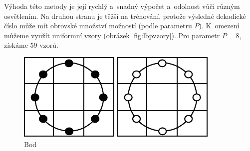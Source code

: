 Výhoda této metody je její rychlý a~snadný výpočet a~odolnost vůči různým osvětlením. Na druhou stranu je těžší na trénování, protože výsledné dekadické číslo může mít obrovské množství možností (podle parametru $P$). K~omezení můžeme využít uniformní vzory (obrázek \ref{fig:lbpvzory}). Pro parametr $P=8$, získáme 59 vzorů. 

\begin{figure}[H]
\centering
\begin{minipage}[b]{.18\textwidth}
  \centering
  \includegraphics[width=.9\linewidth]{figures/lbp_spot}
  \caption*{Bod}
\end{minipage}
\begin{minipage}[b]{.18\textwidth}
  \centering
  \includegraphics[width=.9\linewidth]{figures/lbp_spot_flat}

\end{minipage}
\end{figure}
